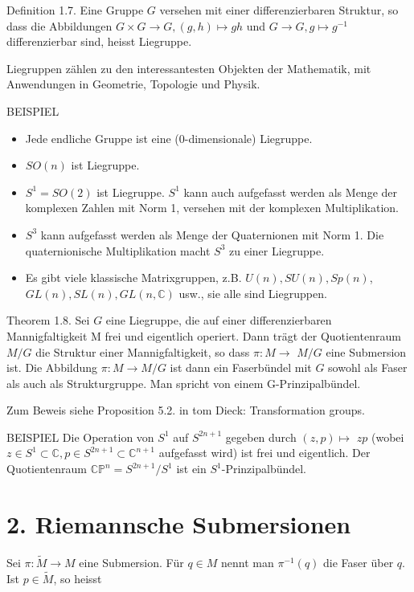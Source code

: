 \documentclass[10pt, letterpaper]{article}
\begin{document}
Definition 1.7. Eine Gruppe $G$ versehen mit einer differenzierbaren Struktur, so dass die Abbildungen $G \times G \rightarrow G,(g, h) \mapsto g h$ und $G \rightarrow G, g \mapsto g^{-1}$ differenzierbar sind, heisst Liegruppe.

Liegruppen zählen zu den interessantesten Objekten der Mathematik, mit Anwendungen in Geometrie, Topologie und Physik.

BEISPIEL

\begin{itemize}
  \item Jede endliche Gruppe ist eine (0-dimensionale) Liegruppe.
  \item $S O(n)$ ist Liegruppe.
  \item $S^{1}=S O(2)$ ist Liegruppe. $S^{1}$ kann auch aufgefasst werden als Menge der komplexen Zahlen mit Norm 1, versehen mit der komplexen Multiplikation.
  \item $S^{3}$ kann aufgefasst werden als Menge der Quaternionen mit Norm 1. Die quaternionische Multiplikation macht $S^{3}$ zu einer Liegruppe.
  \item Es gibt viele klassische Matrixgruppen, z.B. $U(n), S U(n), S p(n)$, $G L(n), S L(n), G L(n, \mathbb{C})$ usw., sie alle sind Liegruppen.
\end{itemize}

Theorem 1.8. Sei $G$ eine Liegruppe, die auf einer differenzierbaren Mannigfaltigkeit M frei und eigentlich operiert. Dann trägt der Quotientenraum $M / G$ die Struktur einer Mannigfaltigkeit, so dass $\pi: M \rightarrow$ $M / G$ eine Submersion ist. Die Abbildung $\pi: M \rightarrow M / G$ ist dann ein Faserbündel mit $G$ sowohl als Faser als auch als Strukturgruppe. Man spricht von einem G-Prinzipalbündel.

Zum Beweis siehe Proposition 5.2. in tom Dieck: Transformation groups.

BEISPIEL Die Operation von $S^{1}$ auf $S^{2 n+1}$ gegeben durch $(z, p) \mapsto$ $z p$ (wobei $z \in S^{1} \subset \mathbb{C}, p \in S^{2 n+1} \subset \mathbb{C}^{n+1}$ aufgefasst wird) ist frei und eigentlich. Der Quotientenraum $\mathbb{C P}^{n}=S^{2 n+1} / S^{1}$ ist ein $S^{1}$-Prinzipalbündel.

\section*{2. Riemannsche Submersionen}
Sei $\pi: \tilde{M} \rightarrow M$ eine Submersion. Für $q \in M$ nennt man $\pi^{-1}(q)$ die Faser über $q$. Ist $p \in \tilde{M}$, so heisst
\end{document}
